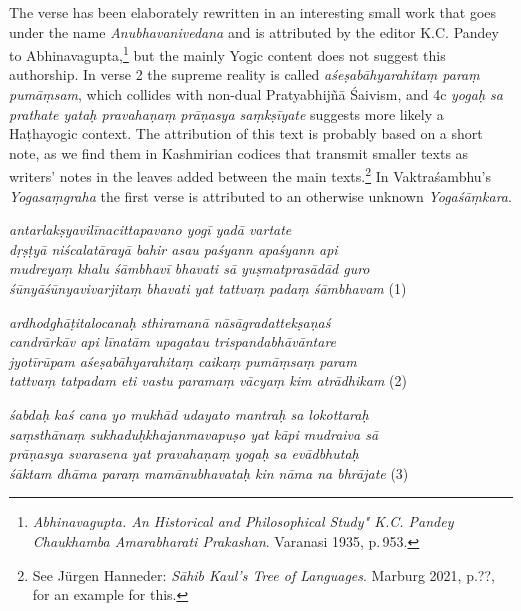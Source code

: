\begin{ekdosis}
\begin{philcomm}[hp01_001]
    The verse has been elaborately rewritten in an interesting small work that goes under the name
    \emph{Anubhavanivedana} and is attributed by the editor K.C. Pandey to
    Abhinavagupta,\footnote{\emph{Abhinavagupta. An Historical and Philosophical Study" K.C. Pandey
        Chaukhamba Amarabharati Prakashan}. Varanasi 1935, p.\,953.} but the mainly Yogic content does
    not suggest this authorship. In verse 2 the supreme reality is called \emph{aśeṣabāhyarahitaṃ paraṃ
      pumāṃsam}, which collides with non-dual Pratyabhijñā Śaivism, and 4c \emph{yogaḥ sa prathate
      yataḥ pravahaṇaṃ prāṇasya saṃkṣīyate} suggests more likely a Haṭhayogic context. The attribution
    of this text is probably based on a short note, as we find them in Kashmirian codices that transmit
    smaller texts as writers' notes in the leaves added between the main texts.\footnote{See Jürgen
      Hanneder: \emph{Sāhib Kaul's Tree of Languages}. Marburg 2021, p.??, for an example for this.}
    In Vaktraśambhu's \emph{Yogasaṃgraha} the first verse is attributed to an otherwise unknown
    \emph{Yogaśāṃkara}. 

    \begin{ekdverse}
      \emph{antarlakṣyavilīnacittapavano yogī yadā vartate}\\
      \emph{dṛṣṭyā niścalatārayā bahir asau paśyann apaśyann api}\\
      \emph{mudreyaṃ khalu śāmbhavī bhavati sā yuṣmatprasādād guro}\\
      \emph{śūnyāśūnyavivarjitaṃ bhavati yat tattvaṃ padaṃ śāmbhavam} (1)\\
    \end{ekdverse}

    \begin{ekdverse}
      \emph{ardhodghāṭitalocanaḥ sthiramanā nāsāgradattekṣaṇaś}\\
      \emph{candrārkāv api līnatām upagatau trispandabhāvāntare}\\
      \emph{jyotīrūpam aśeṣabāhyarahitaṃ caikaṃ pumāṃsaṃ param}\\
      \emph{tattvaṃ tatpadam eti vastu paramaṃ vācyaṃ kim atrādhikam} (2)\\
    \end{ekdverse}

    \begin{ekdverse}
      \emph{śabdaḥ kaś cana yo mukhād udayato mantraḥ sa lokottaraḥ}\\
      \emph{saṃsthānaṃ sukhaduḥkhajanmavapuṣo yat kāpi mudraiva sā}\\
      \emph{prāṇasya svarasena yat pravahaṇaṃ yogaḥ sa evādbhutaḥ}\\
      \emph{śāktam dhāma paraṃ mamānubhavataḥ kin nāma na bhrājate} (3)\\
    \end{ekdverse}


\end{philcomm}
\end{ekdosis}
